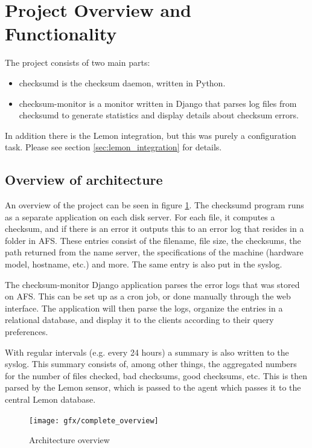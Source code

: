 \section{Project Overview and Functionality}

The project consists of two main parts:
\begin{itemize}
\item checksumd is the checksum daemon, written in Python. 
\item checksum-monitor is a monitor written in Django that parses log files from checksumd to generate statistics and display details about checksum errors.
\end{itemize}

In addition there is the Lemon integration, but this was purely a configuration task. Please see section \ref{sec:lemon_integration} for details. 

\subsection{Overview of architecture}
An overview of the project can be seen in figure \ref{fig:complete_overview}. The checksumd program runs as a separate application on each disk server. For each file, it computes a checksum, and if there is an error it outputs this to an error log that resides in a folder in AFS. These entries consist of the filename, file size, the checksums, the path returned from the name server, the specifications of the machine (hardware model, hostname, etc.) and more. The same entry is also put in the syslog. 

The checksum-monitor Django application parses the error logs that was stored on AFS. This can be set up as a cron job, or done manually through the web interface. The application will then parse the logs, organize the entries in a relational database, and display it to the clients according to their query preferences.

With regular intervals (e.g. every 24 hours) a summary is also written to the syslog. This summary consists of, among other things, the aggregated numbers for the number of files checked, bad checksums, good checksums, etc. This is then parsed by the Lemon sensor, which is passed to the agent which passes it to the central Lemon database.

\begin{figure}[ht]
\centering
\texttt{[image: gfx/complete\_overview]}
\caption{Architecture overview}
\label{fig:complete_overview}
\end{figure}

